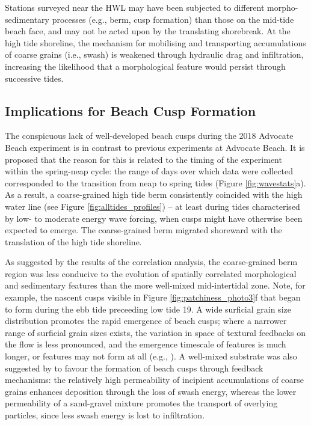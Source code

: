 \documentclass[jmse,article,submit,pdftex,moreauthors]{Definitions/mdpi}
\begin{document}
Stations surveyed near the HWL may have been subjected to different morpho-sedimentary processes (e.g., berm, cusp formation) than those on the mid-tide beach face, and may not be acted upon by the translating shorebreak. At the high tide shoreline, the mechanism for mobilising and transporting accumulations of coarse grains (i.e., swash) is weakened through hydraulic drag and infiltration, increasing the likelihood that a morphological feature would persist through successive tides.


\subsection{Implications for Beach Cusp Formation}\label{Discussion:Cusps}

The conspicuous lack of well-developed beach cusps during the 2018 Advocate Beach experiment is in contrast to previous experiments at Advocate Beach. It is proposed that the reason for this is related to the timing of the experiment within the spring-neap cycle: the range of days over which data were collected corresponded to the transition from neap to spring tides (Figure \ref{fig:wavestats}a). As a result, a coarse-grained high tide berm consistently coincided with the high water line (see Figure \ref{fig:alltides_profiles}) -- at least during tides characterised by low- to moderate energy wave forcing, when cusps might have otherwise been expected to emerge. The coarse-grained berm migrated shoreward with the translation of the high tide shoreline.

As suggested by the results of the correlation analysis, the coarse-grained berm region was less conducive to the evolution of spatially correlated morphological and sedimentary features than the more well-mixed mid-intertidal zone. Note, for example, the nascent cusps visible in Figure \ref{fig:patchiness_photo3}f that began to form during the ebb tide preceeding low tide 19. A wide surficial grain size distribution promotes the rapid emergence of beach cusps; where a narrower range of surficial grain sizes exists, the variation in space of textural feedbacks on the flow is less pronounced, and the emergence timescale of features is much longer, or features may not form at all (e.g., \citep{Guest_Hay2019}). A well-mixed substrate was also suggested by \citet{LonguetHiggins_Parkin1962} to favour the formation of beach cusps through feedback mechanisms: the relatively high permeability of incipient accumulations of coarse grains enhances deposition through the loss of swash energy, whereas the lower permeability of a sand-gravel mixture promotes the transport of overlying particles, since less swash energy is lost to infiltration. 
\end{document}
